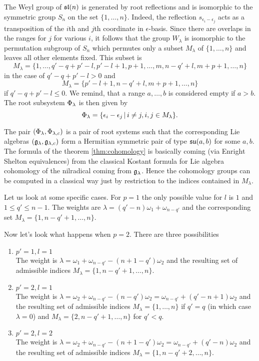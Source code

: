 The Weyl group of $\mathfrak{sl}(n)$ is generated by root reflections and is isomorphic to the symmetric group $S_n$ on the set $\{1,\ldots,n\}$. Indeed, the reflection $s_{\epsilon_i - \epsilon_j}$ acts as a transposition of the $i$th and $j$th coordinate in $\epsilon$-basis. Since there are overlaps in the ranges for $j$ for various $i$, it follows that the group $W_\lambda$ is isomorphic to the permutation subgroup of $S_n$ which permutes only a subset $M_\lambda$ of $\{1,\ldots,n\}$ and leaves all other elements fixed. This subset is
\[
 M_\lambda =  \{ 1,\ldots, q'-q+p'-l, p'-l+1, p+1,\ldots,m, n-q'+l,m+p+1,\ldots,n\}
\]
in the case of $q'-q+p'-l > 0$ and
\[
  M_\lambda =  \{p'-l+1,n-q'+l,m+p+1,\ldots,n\}
\]
if $q'-q+p'-l \leq 0.$ We remind, that a range $a,\ldots,b$ is considered empty if $a>b$. The root subsystem $\Phi_\lambda$ is then given by
\[
 \Phi_\lambda = \{ \epsilon_i - \epsilon_j \,|\, i\neq j, i,j\in M_\lambda \}.
\]

The pair $(\Phi_\lambda,\Phi_{\lambda,c})$ is a pair of root systems such that the corresponding Lie algebras $(\mathfrak{g}_\lambda,\mathfrak{g}_{\lambda,c})$ form a Hermitian symmetric pair of type $\mathfrak{su}(a,b)$ for some $a,b$. The formula of the theorem \ref{thm:cohomology} is basically coming (via Enright Shelton equivalences) from the classical Kostant formula for Lie algebra cohomology of the nilradical coming from $\mathfrak{g}_\lambda$. Hence the cohomology groups can be computed in a classical way just by restriction to the indices contained in $M_\lambda$.

Let us look at some specific cases. For $p=1$ the only possible value for $l$ is $1$ and $1\leq q' \leq n-1$. The weights are $\lambda = (q'-n)\omega_1 + \omega_{n-q'}$ and the corresponding set $M_\lambda = \{ 1,n-q'+1,\ldots,n \}$.


Now let's look what happens when $p=2$. There are three possibilities
\begin{enumerate}
 \item $p'=1, l=1$\\
 The weight is $\lambda=\omega_1+\omega_{n-q'}-(n+1-q')\omega_2$ and the resulting set of admissible indices $M_\lambda = \{1,n-q'+1,\ldots,n\}$.
 \item $p'=2, l=1$\\
 The weight is $\lambda=\omega_2+\omega_{n-q'}-(n-q')\omega_2 = \omega_{n-q'} + (q'-n+1)\omega_2$ and the resulting set of admissible indices $M_\lambda = \{1,\ldots,n\}$ if $q'=q$ (in which case $\lambda = 0$) and $M_\lambda = \{2,n-q'+1,\ldots,n\}$ for $q'<q$.
 \item $p'=2, l=2$\\
 The weight is $\lambda=\omega_2+\omega_{n-q'}-(n+1-q')\omega_2 = \omega_{n-q'}+(q'-n)\omega_2$ and the resulting set of admissible indices $M_\lambda = \{1,n-q'+2,\ldots,n\}$.
\end{enumerate}


